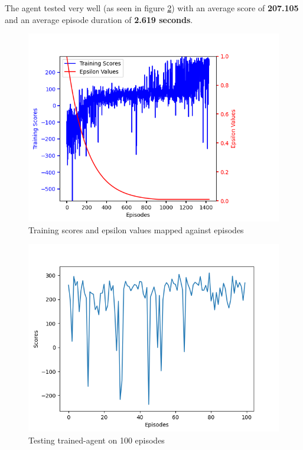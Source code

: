 \documentclass[conference]{IEEEtran}
\begin{document}
The agent tested very well (as seen in figure \ref{fig:agent-test}) with an average score of \textbf{207.105} and an average episode duration of \textbf{2.619 seconds}.

\begin{figure}[]
    \centering
    \includegraphics[scale=0.45]{figs/agent-training}
    \caption{Training scores and epsilon values mapped against episodes}
    \label{fig:agent-training}
\end{figure}

\begin{figure}[]
    \centering
    \includegraphics[scale=0.45]{figs/agent-test}
    \caption{Testing trained-agent on 100 episodes}
    \label{fig:agent-test}
\end{figure}
\end{document}
